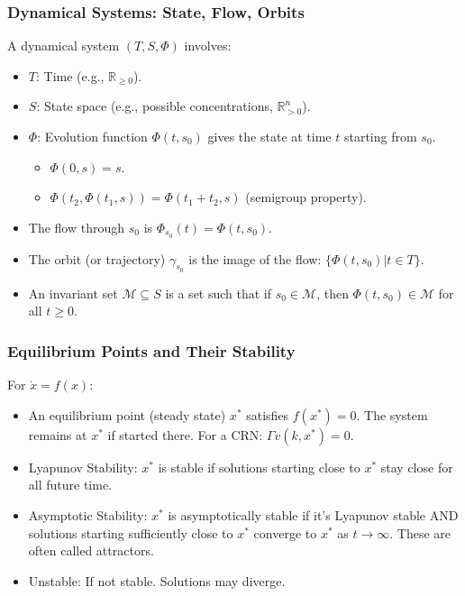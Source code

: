 \documentclass[aspectratio=169]{beamer}
\begin{document}
\begin{frame}{\insertsectionhead}
	\frametitle{Dynamical Systems: State, Flow, Orbits}
	A dynamical system $(T, S, \Phi)$ involves:
	\begin{itemize}
		\item $T$: Time (e.g., $\mathbb{R}_{\ge 0}$).
		\item $S$: State space (e.g., possible concentrations, $\mathbb{R}^n_{>0}$).
		\item $\Phi$: Evolution function $\Phi(t, s_0)$ gives the state at time $t$ starting from $s_0$.
			\begin{itemize}
				\item $\Phi(0, s) = s$.
				\item $\Phi(t_2, \Phi(t_1, s)) = \Phi(t_1+t_2, s)$ (semigroup property).
			\end{itemize}
		\item The \alert{flow} through $s_0$ is $\Phi_{s_0}(t) = \Phi(t,s_0)$.
		\item The \alert{orbit} (or trajectory) $\gamma_{s_0}$ is the image of the flow: $\{\Phi(t,s_0) | t \in T\}$.
		\item An \alert{invariant set} $\mathcal{M} \subseteq S$ is a set such that if $s_0 \in \mathcal{M}$, then $\Phi(t,s_0) \in \mathcal{M}$ for all $t \ge 0$.
	\end{itemize}
\end{frame}

\begin{frame}{\insertsectionhead}
	\frametitle{Equilibrium Points and Their Stability}
	For $\dot{x} = f(x)$:
	\begin{itemize}
		\item An \alert{equilibrium point} (steady state) $x^*$ satisfies $f(x^*) = 0$. The system remains at $x^*$ if started there.
			For a CRN: $\Gamma v(k, x^*) = 0$.
		\item \alert{Lyapunov Stability}: $x^*$ is stable if solutions starting close to $x^*$ stay close for all future time.
		\item \alert{Asymptotic Stability}: $x^*$ is asymptotically stable if it's Lyapunov stable AND solutions starting sufficiently close to $x^*$ converge to $x^*$ as $t \to \infty$. These are often called \alert{attractors}.
		\item \alert{Unstable}: If not stable. Solutions may diverge.
	\end{itemize}
\end{frame}
\end{document}
